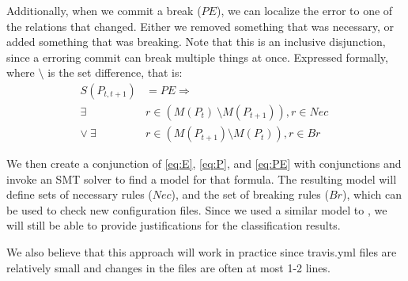 Additionally, when we commit a break ($PE$), we can localize the error to one of the relations that changed.
Either we removed something that was necessary, or added something that was breaking.
Note that this is an inclusive disjunction, since a erroring commit can break multiple things at once.
Expressed formally, where $\setminus$ is the set difference, that is:
\begin{align}
  S(P_{t,t+1}) &= PE \Rightarrow \nonumber \\
  \exists& r \in (M(P_{t})\ \setminus M(P_{t+1})), r \in Nec\ \nonumber \\
  \lor \ \exists& r \in (M(P_{t+1}) \setminus M(P_{t})), r \in Br \label{eq:PE}
\end{align}

We then create a conjunction of \eqref{eq:E}, \eqref{eq:P}, and  \eqref{eq:PE} with
conjunctions and invoke an SMT solver to find a model for that formula.
The resulting model will define sets of necessary rules ($Nec$), and the set of breaking rules ($Br$), which can be used to check new configuration files.
Since we used a similar model to \app, we will still be able to provide justifications for the classification results.

We also believe that this approach will work in practice since travis.yml files are relatively small and changes in the files are often at most 1-2 lines.

